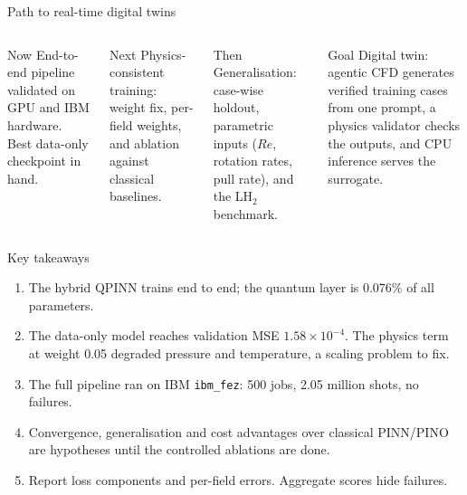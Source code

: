 \documentclass[aspectratio=169]{beamer}
\begin{document}
\begin{frame}{Path to real-time digital twins}
\begin{columns}[T,onlytextwidth]
\begin{block}{Now}
\footnotesize End-to-end pipeline validated on GPU and IBM hardware. Best data-only checkpoint in hand.
\end{block}
\begin{block}{Next}
\footnotesize Physics-consistent training: weight fix, per-field weights, and ablation against classical baselines.
\end{block}
\begin{block}{Then}
\footnotesize Generalisation: case-wise holdout, parametric inputs ($Re$, rotation rates, pull rate), and the LH$_2$ benchmark.
\end{block}
\begin{exampleblock}{Goal}
\footnotesize Digital twin: agentic CFD generates verified training cases from one prompt, a physics validator checks the outputs, and CPU inference serves the surrogate.
\end{exampleblock}
\end{columns}
\end{frame}

\begin{frame}{Key takeaways}
\begin{enumerate}\setlength{\itemsep}{4pt}
  \item The hybrid QPINN trains end to end; the quantum layer is 0.076\% of all parameters.
  \item The data-only model reaches validation MSE $1.58\times10^{-4}$. The physics term at weight 0.05 degraded pressure and temperature, a scaling problem to fix.
  \item The full pipeline ran on IBM \texttt{ibm\_fez}: 500 jobs, 2.05 million shots, no failures.
  \item Convergence, generalisation and cost advantages over classical PINN/PINO are hypotheses until the controlled ablations are done.
  \item Report loss components and per-field errors. Aggregate scores hide failures.
\end{enumerate}
\end{frame}
\end{document}

